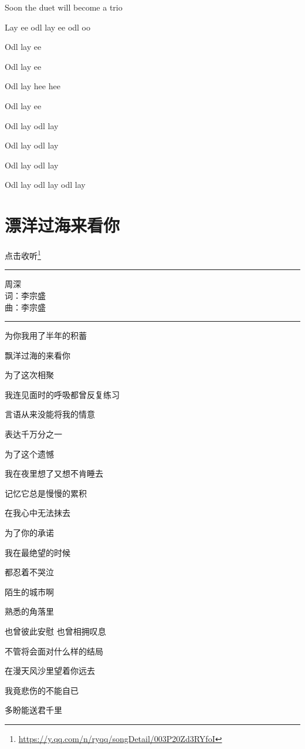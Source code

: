\documentclass[]{ctexbook}
\renewcommand{\href}[2]{#2\footnote{\url{#1}}}
\begin{document}
Soon the duet will become a trio

Lay ee odl lay ee odl oo

Odl lay ee

Odl lay ee

Odl lay hee hee

Odl lay ee

Odl lay odl lay

Odl lay odl lay

Odl lay odl lay

Odl lay odl lay odl lay

\section*{漂洋过海来看你}\label{across-the-ocean-to-see-you}


\href{https://y.qq.com/n/ryqq/songDetail/003P20Zd3RYfoI}{点击收听}

\begin{center}\rule{0.5\linewidth}{0.5pt}\end{center}

周深\\
词：李宗盛\\
曲：李宗盛

\begin{center}\rule{0.5\linewidth}{0.5pt}\end{center}

为你我用了半年的积蓄

飘洋过海的来看你

为了这次相聚

我连见面时的呼吸都曾反复练习

言语从来没能将我的情意

表达千万分之一

为了这个遗憾

我在夜里想了又想不肯睡去

记忆它总是慢慢的累积

在我心中无法抹去

为了你的承诺

我在最绝望的时候

都忍着不哭泣

陌生的城市啊

熟悉的角落里

也曾彼此安慰 也曾相拥叹息

不管将会面对什么样的结局

在漫天风沙里望着你远去

我竟悲伤的不能自已

多盼能送君千里
\end{document}
